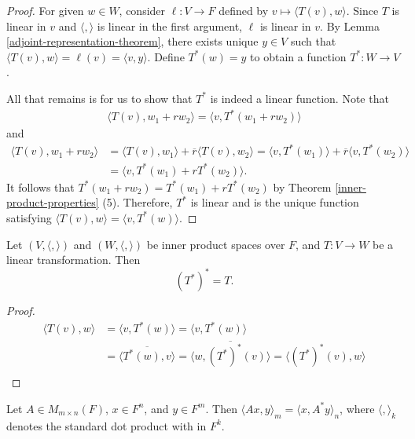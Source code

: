 \begin{proof}
    For given $w \in W$, consider $\ell: V \to F$ defined by $v \mapsto \langle T(v), w \rangle$. Since $T$ is linear in $v$ and $\langle,\rangle$ is linear in the first argument, $\ell$ is linear in $v$. By Lemma \ref{adjoint-representation-theorem}, there exists unique $y \in V$ such that $\langle T(v), w \rangle = \ell(v) = \langle v, y \rangle$. Define $T^*(w) = y$ to obtain a function $T^*: W \to V$.

    All that remains is for us to show that $T^*$ is indeed a linear function. Note that
    \begin{align*}
        \langle T(v), w_1 + rw_2 \rangle = \langle v, T^*(w_1 + rw_2) \rangle
    \end{align*}
    and
    \begin{align*}
        \langle T(v), w_1 + rw_2 \rangle &= \langle T(v), w_1 \rangle + \overline{r}\langle T(v), w_2 \rangle = \langle v, T^*(w_1) \rangle + \overline{r}\langle v, T^*(w_2) \rangle \\
        &= \langle v, T^*(w_1) + rT^*(w_2) \rangle.
    \end{align*}
    It follows that $T^*(w_1 + rw_2) = T^*(w_1) + rT^*(w_2)$ by Theorem \ref{inner-product-properties} (5). Therefore, $T^*$ is linear and is the unique function satisfying $\langle T(v), w \rangle = \langle v, T^*(w) \rangle$.
\end{proof}

\begin{prop}
    Let $(V, \langle, \rangle)$ and $(W, \langle, \rangle)$ be inner product spaces over $F$, and $T: V \to W$ be a linear transformation. Then
    \[(T^*)^* = T.\]
\end{prop}

\begin{proof}
    \begin{align*}
        \langle T(v), w \rangle &= \langle v, T^*(w) \rangle = \langle v, T^*(w) \rangle \\
        &= \overline{\langle T^*(w), v \rangle} = \overline{\langle w, (T^*)^*(v) \rangle} = \langle (T^*)^*(v), w \rangle \\
    \end{align*}
\end{proof}

\begin{lemma}
    Let $A \in M_{m \times n}(F)$, $x \in F^n$, and $y \in F^m$. Then $\langle Ax, y \rangle_m = \langle x, A^{*}y \rangle_n$, where $\langle,\rangle_k$ denotes the standard dot product with in $F^k$.
\end{lemma}

